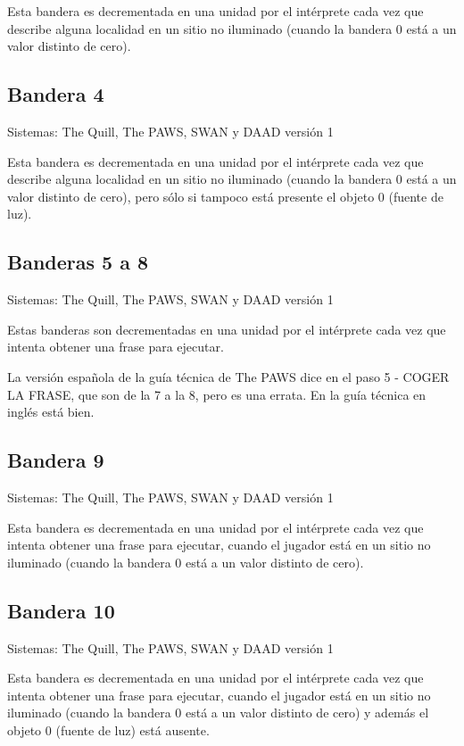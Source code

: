 \documentclass[11pt, a5paper]{article}
\newcommand{\quill}{\textsf{The Quill}\xspace}
\newcommand{\paw}{\textsf{The PAWS}\xspace}
\newcommand{\swan}{\textsf{SWAN}\xspace}
\newcommand{\daad}{\textsf{DAAD}\xspace}
\newcommand{\sistemas}[1]{\noindent Sistemas: #1 \nopagebreak}
\begin{document}
Esta bandera es decrementada en una unidad por el intérprete cada vez que describe alguna localidad en un sitio no iluminado (cuando la bandera 0 está a un valor distinto de cero).

\subsection{Bandera 4}

\sistemas{\quill, \paw, \swan y \daad versión 1}

Esta bandera es decrementada en una unidad por el intérprete cada vez que describe alguna localidad en un sitio no iluminado (cuando la bandera 0 está a un valor distinto de cero), pero sólo si tampoco está presente el objeto 0 (fuente de luz).

\subsection{Banderas 5 a 8}

\sistemas{\quill, \paw, \swan y \daad versión 1}

Estas banderas son decrementadas en una unidad por el intérprete cada vez que intenta obtener una frase para ejecutar.

La versión española de la guía técnica de \paw dice en el paso 5 - COGER LA FRASE, que son de la 7 a la 8, pero es una errata. En la guía técnica en inglés \cite{PawsPC} está bien.

\subsection{Bandera 9}

\sistemas{\quill, \paw, \swan y \daad versión 1}

Esta bandera es decrementada en una unidad por el intérprete cada vez que intenta obtener una frase para ejecutar, cuando el jugador está en un sitio no iluminado (cuando la bandera 0 está a un valor distinto de cero).

\subsection{Bandera 10}

\sistemas{\quill, \paw, \swan y \daad versión 1}

Esta bandera es decrementada en una unidad por el intérprete cada vez que intenta obtener una frase para ejecutar, cuando el jugador está en un sitio no iluminado (cuando la bandera 0 está a un valor distinto de cero) y además el objeto 0 (fuente de luz) está ausente.
\end{document}
